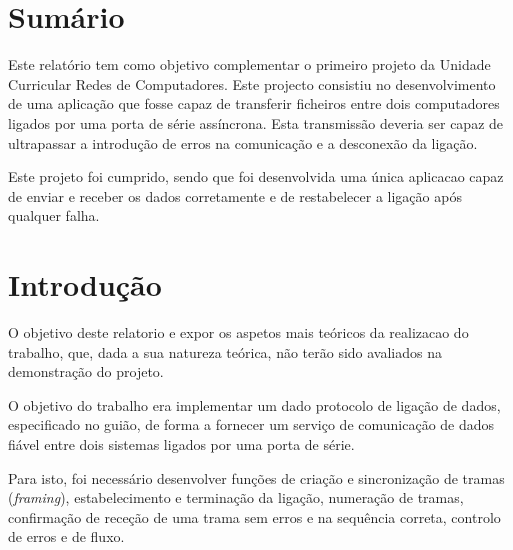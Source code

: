 \documentclass[11pt]{article}
\begin{document}
\newpage

\tableofcontents

\newpage

\section{Sumário}

Este relatório tem como objetivo complementar o primeiro projeto da Unidade Curricular Redes de Computadores. Este projecto consistiu no desenvolvimento de uma aplicação que fosse capaz de transferir ficheiros entre dois computadores ligados por uma porta de série assíncrona. Esta transmissão deveria ser capaz de ultrapassar a introdução de erros na comunicação e a desconexão da ligação.

Este projeto foi cumprido, sendo que foi desenvolvida uma única aplicacao capaz de enviar e receber os dados corretamente e de restabelecer a ligação após qualquer falha.

\newpage

\section{Introdução}

O objetivo deste relatorio e expor os aspetos mais teóricos da realizacao do trabalho, que, dada a sua natureza teórica, não terão sido avaliados na demonstração do projeto.

O objetivo do trabalho era implementar um dado protocolo de ligação de dados, especificado no guião, de forma a fornecer um serviço de comunicação de dados fiável entre dois sistemas ligados por uma porta de série. 

Para isto, foi necessário desenvolver funções de criação e sincronização de tramas (\textit{framing}), estabelecimento e terminação da ligação, numeração de tramas, confirmação de receção de uma trama sem erros e na sequência correta, controlo de erros %
e de fluxo.
\end{document}
